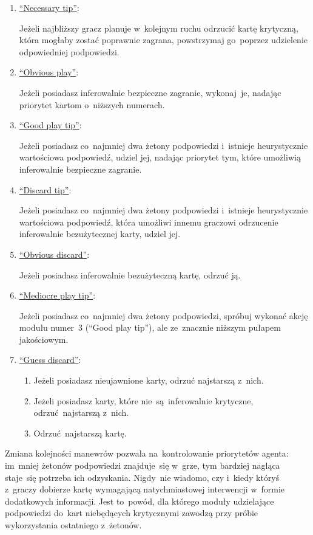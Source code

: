 \documentclass[declaration,shortabstract,inz]{iithesis}
\begin{document}
\begin{enumerate}
	\item \underline{``Necessary tip''}:
	
	Jeżeli najbliższy gracz planuje w~kolejnym ruchu odrzucić kartę krytyczną, która mogłaby zostać poprawnie zagrana, powstrzymaj go~poprzez udzielenie odpowiedniej podpowiedzi.

	\item \underline{``Obvious play''}:
	
	Jeżeli posiadasz inferowalnie bezpieczne zagranie, wykonaj~je, nadając priorytet kartom o~niższych numerach.

	\item \underline{``Good play tip''}:
	
	Jeżeli posiadasz co~najmniej dwa żetony podpowiedzi i~istnieje heurystycznie wartościowa podpowiedź, udziel jej, nadając priorytet tym, które umożliwią inferowalnie bezpieczne zagranie.

	\item \underline{``Discard tip''}:
	
	Jeżeli posiadasz co~najmniej dwa żetony podpowiedzi i~istnieje heurystycznie wartościowa podpowiedź, która umożliwi innemu graczowi odrzucenie inferowalnie bezużytecznej karty, udziel jej.

	\item \underline{``Obvious discard''}:
	
	Jeżeli posiadasz inferowalnie bezużyteczną kartę, odrzuć ją.

	\item \underline{``Mediocre play tip''}:
	
	Jeżeli posiadasz co~najmniej dwa żetony podpowiedzi, spróbuj wykonać akcję modułu numer~3 (``Good play tip''), ale ze~znacznie niższym pułapem jakościowym.

	\item \underline{``Guess discard''}:
	\begin{enumerate}
		\item Jeżeli posiadasz nieujawnione karty, odrzuć najstarszą z~nich.
		\item Jeżeli posiadasz karty, które nie~są~inferowalnie krytyczne, odrzuć najstarszą z~nich.
		\item Odrzuć najstarszą kartę.
	\end{enumerate}

\end{enumerate}

Zmiana kolejności manewrów pozwala na~kontrolowanie priorytetów agenta: im~mniej żetonów podpowiedzi znajduje~się w~grze, tym bardziej nagląca staje~się potrzeba ich odzyskania. Nigdy~nie wiadomo, czy i~kiedy któryś z~graczy dobierze kartę wymagającą natychmiastowej interwencji w~formie dodatkowych informacji. Jest to~powód, dla którego moduły udzielające podpowiedzi do~kart niebędących krytycznymi zawodzą przy próbie wykorzystania ostatniego z~żetonów.
\end{document}
